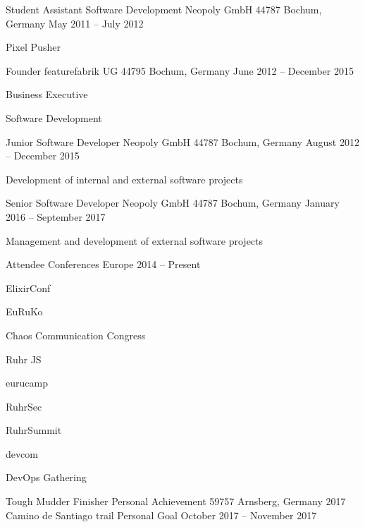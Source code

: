 \documentclass[]{awesome-cv}
\begin{document}
\vspace{-2mm}
\begin{cventries}
	\cventry
	{Student Assistant Software Development}
	{Neopoly GmbH}
	{44787 Bochum, Germany}
	{May 2011 – July 2012}
	{\begin{cvitems}
		\item {Pixel Pusher}
		\end{cvitems}}
	\cventry
	{Founder}
	{featurefabrik UG}
	{44795 Bochum, Germany}
	{June 2012 – December 2015}
	{\begin{cvitems}
		\item {Business Executive}
		\item {Software Development}
		\end{cvitems}}
	\cventry
	{Junior Software Developer}
	{Neopoly GmbH}
	{44787 Bochum, Germany}
	{August 2012 – December 2015}
	{\begin{cvitems}
		\item {Development of internal and external software projects}
		\end{cvitems}}
	\cventry
	{Senior Software Developer}
	{Neopoly GmbH}
	{44787 Bochum, Germany}
	{January 2016 – September 2017}
	{\begin{cvitems}
		\item {Management and development of external software projects}
		\end{cvitems}}
	\cventry
	{Attendee}
	{Conferences}
	{Europe}
	{2014 – Present}
	{\begin{cvitems}
		\item {ElixirConf}
		\item {EuRuKo}
		\item {Chaos Communication Congress}
		\item {Ruhr JS}
		\item {eurucamp}
		\item {RuhrSec}
		\item {RuhrSummit}
		\item {devcom}
		\item {DevOps Gathering}
		\end{cvitems}}
	\cventry
	{Tough Mudder Finisher}
	{Personal Achievement}
	{59757 Arnsberg, Germany}
	{2017}
	{}
	\cventry
	{Camino de Santiago trail}
	{Personal Goal}
	{}
	{October 2017 – November 2017}
	{}
\end{cventries}

\newpage
\end{document}
